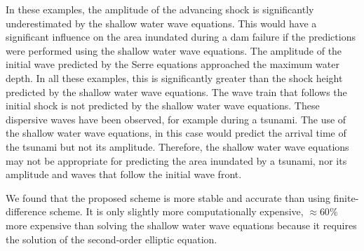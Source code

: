 \documentclass[SingleSpace,12pt]{Serre_ASCE}
\begin{document}
In these examples, the amplitude of the advancing shock is significantly underestimated by the shallow water wave equations. This would have a significant influence on the area inundated during a dam failure if the predictions were performed using the shallow water wave equations. The amplitude of the initial wave predicted by the Serre equations approached the maximum water depth. In all these examples, this is significantly greater than the shock height predicted by the shallow water wave equations. The wave train that follows the initial shock is not predicted by the shallow water wave equations. These dispersive waves have been observed, for example during a tsunami. The use of the shallow water wave equations, in this case would predict the arrival time of the tsunami but not its amplitude. Therefore, the shallow water wave equations may not be appropriate for predicting the area inundated by a tsunami, nor its amplitude and waves that follow the initial wave front.

We found that the proposed scheme is more stable and accurate than using finite-difference scheme. It is only slightly more computationally expensive, $\approx 60\%$ more expensive than solving the shallow water wave equations because it requires the solution of the second-order elliptic equation.
\end{document}
